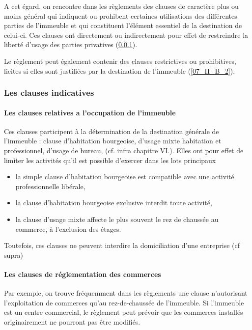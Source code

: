 		A cet égard, on rencontre dans les règlements des clauses de caractère plus ou moins général qui indiquent ou prohibent certaines utilisations des différentes parties de l'immeuble et qui constituent l'élément essentiel de la destination de celui-ci. Ces clauses ont directement ou indirectement pour effet de restreindre la liberté d'usage des parties privatives (\ref{07_II_B_1}).
		
		Le règlement peut également contenir des clauses restrictives ou prohibitives, licites si elles sont justifiées par la destination de l’immeuble (\ref{07_II_B_2}).
		
		\subsubsection{Les clauses indicatives}\label{07_II_B_1}
		
			\paragraph{Les clauses relatives a l’occupation de l’immeuble}
			
				Ces clauses participent à la détermination de la destination générale de l'immeuble : clause d’habitation bourgeoise, d’usage mixte habitation et professionnel, d’usage de bureau, \etc (cf. infra chapitre VI.). Elles ont pour effet de limiter les activités qu’il est possible d’exercer dans les lots principaux
				\begin{itemize}
					\item la simple clause d’habitation bourgeoise est compatible avec une activité professionnelle libérale,
					\item la clause d’habitation bourgeoise exclusive interdit toute activité,
					\item la clause d’usage mixte affecte le plus souvent le rez de chaussée au commerce, à l’exclusion des étages.
				\end{itemize}
				
				Toutefois, ces clauses ne peuvent interdire la domiciliation d’une entreprise (cf supra)
				
			\paragraph{Les clauses de réglementation des commerces}
				
				Par exemple, on trouve fréquemment dans les règlements une clause n'autorisant l'exploitation de commerces qu'au rez-de-chaussée de l'immeuble. Si l'immeuble est un centre commercial, le règlement peut prévoir que les commerces installés originairement ne pourront pas être modifiés.
				
